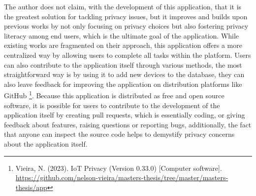 The author does not claim, with the development of this application, that
it is the greatest solution for tackling \hyperlink{\acronym}{\acronym} privacy issues, but it improves
and builds upon previous works by not only focusing on privacy choices but also
fostering privacy literacy among end users, which is the ultimate goal
of the application. While existing works are fragmented on their approach,
this application offers a more centralized way by allowing users to complete
all tasks within the platform. Users can also contribute to the application itself
through various methods, the most straightforward way is by using it to
add new \hyperlink{\acronym}{\acronym} devices to the database, they can also leave
feedback for improving the application on distribution platforms like
GitHub \footnote{Vieira, N. (2023). IoT Privacy (Version 0.33.0) [Computer software]. \url{https://github.com/nelson-vieira/masters-thesis/tree/master/masters-thesis/app}}.
Because this application is distributed as free and open source software, it
is possible for users to contribute to the development of the
application itself by creating pull requests, which is essentially coding,
or giving feedback about features, raising questions or reporting bugs,
additionally, the fact that anyone can inspect the source code helps
to demystify privacy concerns about the application itself.
